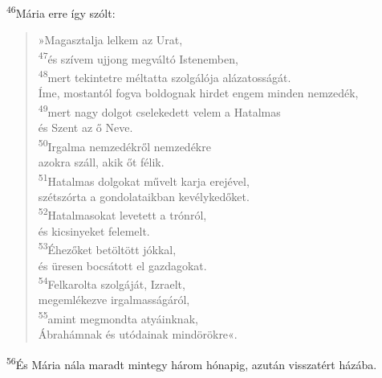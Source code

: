 \documentclass[10pt]{article}
\begin{document}
\begin{multicols}{2}
\newlength{\saveleftmargini} %
\setlength{\saveleftmargini}{\leftmargini} %
\setlength{\leftmargini}{2em} %
\textsuperscript{46}Mária erre így szólt:
\disablehyphenation
\begin{flushleft}
\begin{verse}
»Magasztalja lelkem az Urat, \\
\textsuperscript{47}és szívem ujjong megváltó Istenemben, \\
\textsuperscript{48}mert tekintetre méltatta szolgálója alázatosságát. \\
Íme, mostantól fogva boldognak hirdet engem minden nemzedék, \\
\textsuperscript{49}mert nagy dolgot cselekedett velem a Hatalmas\\ és Szent az ő Neve. \\
\textsuperscript{50}Irgalma nemzedékről nemzedékre \\ azokra száll, akik őt félik. \\
\textsuperscript{51}Hatalmas dolgokat művelt karja erejével, \\ szétszórta a gondolataikban kevélykedőket. \\
\textsuperscript{52}Hatalmasokat levetett a trónról, \\ és kicsinyeket felemelt. \\
\textsuperscript{53}Éhezőket betöltött jókkal, \\ és üresen bocsátott el gazdagokat. \\
\textsuperscript{54}Felkarolta szolgáját, Izraelt, \\ megemlékezve irgalmasságáról, \\
\textsuperscript{55}amint megmondta atyáinknak, \\ Ábrahámnak és utódainak mindörökre«.
\end{verse}
\end{flushleft}
\enablehyphenation
\setlength{\leftmargini}{\saveleftmargini}
\textsuperscript{56}És Mária nála maradt mintegy három hónapig, azután visszatért házába.

\end{multicols}
\end{document}
